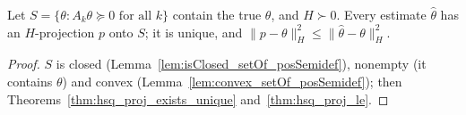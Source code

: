 \begin{theorem}\label{thm:proj_posSemidef}
  \leanok
  Let $S = \{\theta : A_k\theta \succeq 0 \text{ for all } k\}$ contain the true $\theta$, and
  $H \succ 0$. Every estimate $\hat\theta$ has an $H$-projection $p$ onto $S$; it is unique, and
  $\|p - \theta\|_H^2 \le \|\hat\theta - \theta\|_H^2$.
\end{theorem}
\begin{proof}
  \leanok
  $S$ is closed (Lemma~\ref{lem:isClosed_setOf_posSemidef}), nonempty (it contains $\theta$) and
  convex (Lemma~\ref{lem:convex_setOf_posSemidef}); then
  Theorems~\ref{thm:hsq_proj_exists_unique} and~\ref{thm:hsq_proj_le}.
\end{proof}
